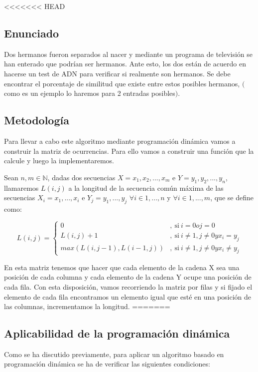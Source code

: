 <<<<<<< HEAD
\subsection{Enunciado}
Dos hermanos fueron separados al nacer y mediante un programa de televisión se han
enterado que podrían ser hermanos. Ante esto, los dos están de acuerdo en hacerse un test de
ADN para verificar si realmente son hermanos. Se debe encontrar el porcentaje de similitud que existe 
entre estos posibles hermanos, $($como es un ejemplo lo haremos para 2 entradas posibles$)$.

\subsection{Metodología}
Para llevar a cabo este algoritmo mediante programación dinámica vamos a construir la matriz de 
ocurrencias. Para ello vamos a construir una función que la calcule y luego la implementaremos.

Sean $n,m \in \mathbb{N}$, dadas dos secuencias $X = { x_1,x_2,...,x_m}$ e $Y = { y_1,y_2,...,y_n}$, llamaremos $L(i,j)$ a la 
longitud de la secuencia común máxima de las secuencias $X_i = {x_1,...,x_i}$ e $Y_j = {y_1,...,y_j}$ $\forall i \in {1,...,n} $ y $\forall i \in {1,...,m}$, 
que se define como:  

\[
  L(i,j) = 
  \left \{
    \begin{aligned}
      0 &,\ \text{si} \ i = 0 o j = 0\\
      L(i,j) + 1 &,\ \text{si} \ i \neq  1 , j \neq  0  y x_i = y_j\\
      max(L(i,j-1) , L(i-1,j))&,\ \text{si} \ i \neq 1 , j \neq 0 y x_i \neq y_j
    \end{aligned}
  \right .
\]

En esta matriz tenemos que hacer que cada elemento de la cadena X sea una posición de cada columna 
y cada elemento de la cadena Y ocupe una posición de cada fila. Con esta disposición, vamos recorriendo
la matriz por filas y si fijado el elemento de cada fila encontramos un elemento igual que esté en una 
posición de las columnas, incrementamos la longitud.
=======

\subsection{Aplicabilidad de la programación dinámica}

Como se ha discutido previamente, para aplicar un algoritmo basado en programación
dinámica se ha de verificar las siguientes condiciones:


